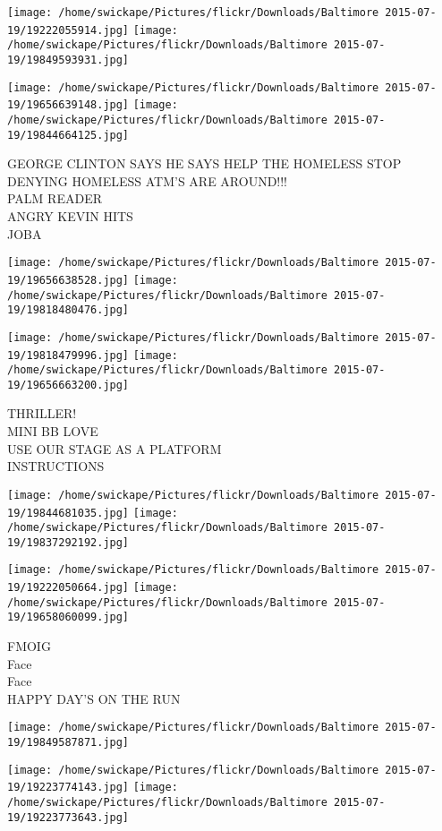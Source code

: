 \documentclass[10pt,letterpaper]{article}
\begin{document}
\texttt{[image: /home/swickape/Pictures/flickr/Downloads/Baltimore 2015-07-19/19222055914.jpg]}
\texttt{[image: /home/swickape/Pictures/flickr/Downloads/Baltimore 2015-07-19/19849593931.jpg]}

\texttt{[image: /home/swickape/Pictures/flickr/Downloads/Baltimore 2015-07-19/19656639148.jpg]}
\texttt{[image: /home/swickape/Pictures/flickr/Downloads/Baltimore 2015-07-19/19844664125.jpg]}

GEORGE CLINTON SAYS HE SAYS HELP THE HOMELESS STOP DENYING HOMELESS ATM'S ARE AROUND!!!\\
PALM READER\\
ANGRY KEVIN HITS\\
JOBA
\pagebreak

\texttt{[image: /home/swickape/Pictures/flickr/Downloads/Baltimore 2015-07-19/19656638528.jpg]}
\texttt{[image: /home/swickape/Pictures/flickr/Downloads/Baltimore 2015-07-19/19818480476.jpg]}

\texttt{[image: /home/swickape/Pictures/flickr/Downloads/Baltimore 2015-07-19/19818479996.jpg]}
\texttt{[image: /home/swickape/Pictures/flickr/Downloads/Baltimore 2015-07-19/19656663200.jpg]}

THRILLER!\\
MINI BB LOVE\\
USE OUR STAGE AS A PLATFORM\\
INSTRUCTIONS
\pagebreak

\texttt{[image: /home/swickape/Pictures/flickr/Downloads/Baltimore 2015-07-19/19844681035.jpg]}
\texttt{[image: /home/swickape/Pictures/flickr/Downloads/Baltimore 2015-07-19/19837292192.jpg]}

\texttt{[image: /home/swickape/Pictures/flickr/Downloads/Baltimore 2015-07-19/19222050664.jpg]}
\texttt{[image: /home/swickape/Pictures/flickr/Downloads/Baltimore 2015-07-19/19658060099.jpg]}

FMOIG\\
Face\\
Face\\
HAPPY DAY'S ON THE RUN
\pagebreak

\texttt{[image: /home/swickape/Pictures/flickr/Downloads/Baltimore 2015-07-19/19849587871.jpg]}

\vspace{0.25in}
\texttt{[image: /home/swickape/Pictures/flickr/Downloads/Baltimore 2015-07-19/19223774143.jpg]}
\texttt{[image: /home/swickape/Pictures/flickr/Downloads/Baltimore 2015-07-19/19223773643.jpg]}
\end{document}
